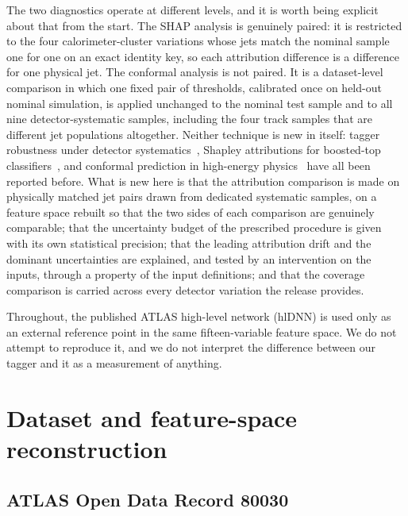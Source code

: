 \documentclass[pdflatex,sn-mathphys,Numbered,iicol]{sn-jnl}
\begin{document}
The two diagnostics operate at different levels, and it is worth being explicit about
that from the start. The SHAP analysis is genuinely paired: it is restricted to the
four calorimeter-cluster variations whose jets match the nominal sample one for one on
an exact identity key, so each attribution difference is a difference for one physical
jet. The conformal analysis is not paired. It is a dataset-level comparison in which
one fixed pair of thresholds, calibrated once on held-out nominal simulation, is
applied unchanged to the nominal test sample and to all nine detector-systematic
samples, including the four track samples that are different jet populations
altogether. Neither technique is new in itself: tagger robustness under detector
systematics~\cite{ATLAS2024,CMS2020,Sahu2024}, Shapley attributions for boosted-top
classifiers~\cite{Bhattacherjee2024,Sahu2024}, and conformal prediction in high-energy
physics~\cite{Araz2025} have all been reported before. What is new here is that the
attribution comparison is made on physically matched jet pairs drawn from dedicated
systematic samples, on a feature space rebuilt so that the two sides of each comparison
are genuinely comparable; that the uncertainty budget of the prescribed procedure is
given with its own statistical precision; that the leading attribution drift and the
dominant uncertainties are explained, and tested by an intervention on the inputs,
through a property of the input definitions; and that the coverage comparison is carried across every detector
variation the release provides.

Throughout, the published ATLAS high-level network (hlDNN) is used only as an external
reference point in the same fifteen-variable feature space. We do not attempt to
reproduce it, and we do not interpret the difference between our tagger and it as a
measurement of anything.

\section{Dataset and feature-space reconstruction}
\label{sec:data}

\subsection{ATLAS Open Data Record 80030}
\label{sec:record}
\end{document}
